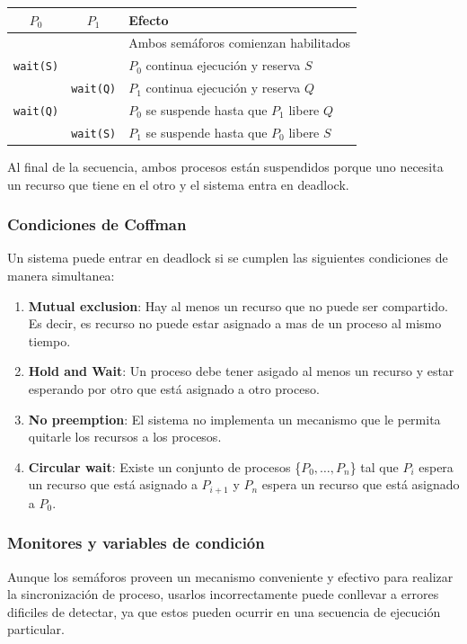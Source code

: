 \begin{center}
\begin{tabularx}{0.8\textwidth}{|C{0.5}|C{0.5}|L{2}|}
	\hline 
	\textbf{$P_0$} & \textbf{$P_1$} & Efecto \\
	\hline
	& & Ambos semáforos comienzan habilitados \\
	\hline
	\texttt{wait(S)} & & $P_0$ continua ejecución y reserva $S$\\
	\hline
	 & \texttt{wait(Q)} & $P_1$ continua ejecución y reserva $Q$ \\
	\hline
	\texttt{wait(Q)}  & & $P_0$ se suspende hasta que $P_1$ libere $Q$ \\	
	\hline
	 & \texttt{wait(S)} &  $P_1$ se suspende hasta que $P_0$ libere $S$\\	
	\hline
\end{tabularx}
 \end{center}
Al final de la secuencia, ambos procesos están suspendidos porque uno necesita un recurso que tiene en el otro y el sistema entra en deadlock.

\subsubsection{Condiciones de Coffman}
Un sistema puede entrar en deadlock si se cumplen las siguientes condiciones de manera simultanea:

\begin{enumerate}
	\item\textbf{Mutual exclusion}: Hay al menos un recurso que no puede ser compartido. Es decir, es recurso no puede estar asignado a mas de un proceso al mismo tiempo.
	\item \textbf{Hold and Wait}: Un proceso debe tener asigado al menos un recurso y estar esperando por otro que está asignado a otro proceso.
	\item \textbf{No preemption}: El sistema no implementa un mecanismo que le permita quitarle los recursos a los procesos.
	\item \textbf{Circular wait}: Existe un conjunto de procesos \{$P_0,\dots,P_n$\} tal que $P_i$ espera un recurso que está asignado a $P_{i+1}$ y $P_n$ espera un recurso que está asignado a $P_0$.
\end{enumerate}

\subsubsection{Monitores y variables de condición}
Aunque los semáforos proveen un mecanismo conveniente y efectivo para realizar la sincronización de proceso, usarlos incorrectamente puede conllevar a errores dificiles de detectar, ya que estos pueden ocurrir en una secuencia de ejecución particular.

